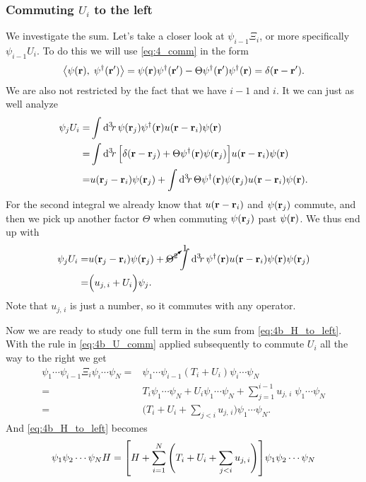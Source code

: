 \documentclass[11pt,letter, swedish, english
]{article}
\begin{document}
\subsubsection{Commuting $U_i$ to the left}
We investigate the sum. Let's take a closer look at $\psi_{i-1}\Xi_i$,
or more specifically $\psi_{i-1}U_i$. To do this we will use
\eqref{eq:4_comm} in the form
\begin{equation}
\left\langle\psi(\vb{r}),\;\psi^\dagger(\vb{r}')\right\rangle
=\psi(\vb{r})\psi^\dagger(\vb{r}')-\Theta\psi^\dagger(\vb{r}')\psi^\dagger(\vb{r})
=\delta(\vb{r}-\vb{r}').
\end{equation}
We are also not restricted by the fact that we have $i-1$ and $i$. It
we can just as well analyze
\begin{equation}
\begin{aligned}
\psi_{j}U_i=&\int\rd^3\!r\,
\psi(\vb{r}_{j})\psi^\dagger(\vb{r})
u(\vb{r}-\vb{r}_i)\psi(\vb{r})\\
=&\int\rd^3\!r\,
\Big[\delta(\vb{r}-\vb{r}_{j}) 
+ \Theta\psi^\dagger(\vb{r})\psi(\vb{r}_{j})\Big]
u(\vb{r}-\vb{r}_i)\psi(\vb{r})\\
=&
u(\vb{r}_{j}-\vb{r}_{i})\psi(\vb{r}_{j}) 
+ \int\rd^3\!r\,
\Theta\psi^\dagger(\vb{r})\psi(\vb{r}_{j})
u(\vb{r}-\vb{r}_i)\psi(\vb{r}).
\end{aligned}
\end{equation}
For the second integral we already know that $u(\vb{r}-\vb{r}_i)$ and
$\psi(\vb{r}_{j})$ commute, and then we pick up another factor
$\Theta$ when commuting $\psi(\vb{r}_{j})$ past $\psi(\vb{r})$. We
thus end up with
\begin{equation}\label{eq:4b_U_comm}
\begin{aligned}
\psi_{j}U_i=&
u(\vb{r}_{j}-\vb{r}_{i})\psi(\vb{r}_{j}) 
+ \cancelto{1}{\Theta^2}\int\rd^3\!r\,
\psi^\dagger(\vb{r})u(\vb{r}-\vb{r}_i)\psi(\vb{r})
\psi(\vb{r}_{j})\\
=&\Big(u_{j,\,i}+U_i \Big)\psi_{j}.
\end{aligned}
\end{equation}
Note that $u_{j,\,i}$ is just a number, so it commutes with any operator. 

Now we are ready to study one full term in the sum from
\eqref{eq:4b_H_to_left}. With the rule in \eqref{eq:4b_U_comm} applied
subsequently to commute $U_i$ all the way to the right we get
\begin{equation}
\begin{aligned}
\psi_1\cdots\psi_{i-1}\Xi_i\psi_i\cdots\psi_N
=&\psi_1\cdots\psi_{i-1}(T_i+U_i)\psi_i\cdots\psi_N\\
=&T_i\psi_1\cdots\psi_{N}
+U_i\psi_1\cdots\psi_{N}
+\sum_{j=1}^{i-1}u_{j,\,i}\;\psi_1\cdots\psi_{N}\\
=&\Bigg(T_i+U_i+\sum_{j<i}u_{j,\,i}\Bigg)\psi_1\cdots\psi_{N}.
\end{aligned}
\end{equation}
And \eqref{eq:4b_H_to_left} becomes
\begin{equation}\label{eq:4b_all_to_left}
\psi_1\psi_2\cdots\psi_{N}H=
\qty[H
+\sum_{i=1}^N\Bigg(T_i+U_i+\sum_{j<i}u_{j,\,i}\Bigg)
]\psi_1\psi_2\cdots\psi_{N}
\end{equation}
\end{document}
